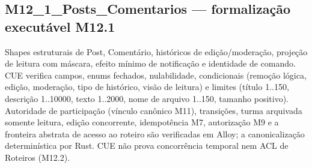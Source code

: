 \subsection*{M12\_1\_Posts\_Comentarios --- formalização executável M12.1}
Shapes estruturais de Post, Comentário, históricos de edição/moderação, projeção de leitura com máscara, efeito mínimo de notificação e identidade de comando. CUE verifica campos, enums fechados, nulabilidade, condicionais (remoção lógica, edição, moderação, tipo de histórico, visão de leitura) e limites (título 1..150, descrição 1..10000, texto 1..2000, nome de arquivo 1..150, tamanho positivo). Autoridade de participação (vínculo canônico M11), transições, turma arquivada somente leitura, edição concorrente, idempotência M7, autorização M9 e a fronteira abstrata de acesso ao roteiro são verificadas em Alloy; a canonicalização determinística por Rust. CUE não prova concorrência temporal nem ACL de Roteiros (M12.2).
